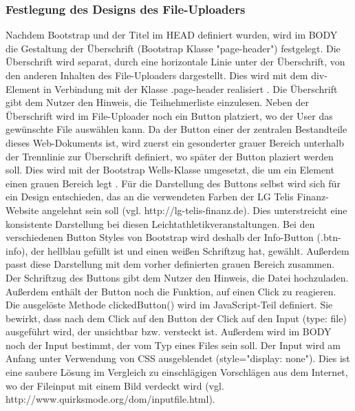 \subsubsection{Festlegung des Designs des File-Uploaders}
Nachdem Bootstrap und der Titel im HEAD definiert wurden, wird im BODY die Gestaltung der Überschrift (Bootstrap Klasse "page-header") festgelegt. Die Überschrift wird separat, durch eine horizontale Linie unter der Überschrift, von den anderen Inhalten des File-Uploaders dargestellt. Dies wird mit dem div-Element in Verbindung mit der Klasse .page-header realisiert \cite{header}. Die Überschrift gibt dem Nutzer den Hinweis, die Teilnehmerliste einzulesen.
Neben der Überschrift wird im File-Uploader noch ein Button platziert, wo der User das gewünschte File auswählen kann. Da der Button einer der zentralen Bestandteile dieses Web-Dokuments ist, wird zuerst ein gesonderter grauer Bereich unterhalb der Trennlinie zur Überschrift definiert, wo später der Button plaziert werden soll. Dies wird mit der Bootstrap Wells-Klasse umgesetzt, die um ein Element einen grauen Bereich legt \cite{wells}. 
Für die Darstellung des Buttons selbst wird sich für ein Design entschieden, das an die verwendeten Farben der LG Telis Finanz-Website angelehnt sein soll (vgl. http://lg-telis-finanz.de). Dies unterstreicht eine konsistente Darstellung bei diesen Leichtathletikveranstaltungen. Bei den verschiedenen Button Styles von Bootstrap wird deshalb der Info-Button (.btn-info), der hellblau gefüllt ist und einen weißen Schriftzug hat, gewählt. Außerdem passt diese Darstellung mit dem vorher definierten grauen Bereich zusammen. Der Schriftzug des Buttons gibt dem Nutzer den Hinweis, die Datei hochzuladen. Außerdem enthält der Button noch die Funktion, auf einen Click zu reagieren. Die ausgelöste Methode clickedButton() wird im JavaScript-Teil definiert. Sie bewirkt, dass nach dem Click auf den Button der Click auf den Input (type: file) ausgeführt wird, der unsichtbar bzw. versteckt ist.
Außerdem wird im BODY noch der Input bestimmt, der vom Typ eines Files sein soll. Der Input wird am Anfang unter Verwendung von CSS ausgeblendet (style="display: none"). Dies ist eine saubere Lösung im Vergleich zu einschlägigen Vorschlägen aus dem Internet, wo der Fileinput mit einem Bild verdeckt wird (vgl. http://www.quirksmode.org/dom/inputfile.html).


